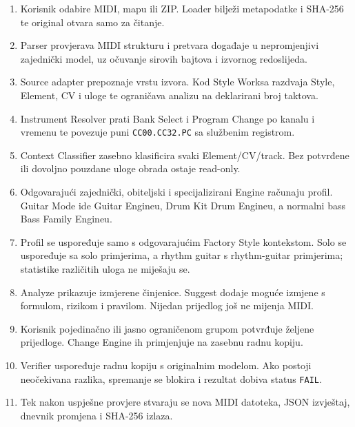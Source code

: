 \documentclass[11pt]{article}
\begin{document}
\begin{enumerate}[label=W\arabic*.]
    \item Korisnik odabire MIDI, mapu ili ZIP. Loader bilježi metapodatke i
    SHA-256 te original otvara samo za čitanje.

    \item Parser provjerava MIDI strukturu i pretvara događaje u nepromjenjivi
    zajednički model, uz očuvanje sirovih bajtova i izvornog redoslijeda.

    \item Source adapter prepoznaje vrstu izvora. Kod Style Worksa razdvaja
    Style, Element, CV i uloge te ograničava analizu na deklarirani broj
    taktova.

    \item Instrument Resolver prati Bank Select i Program Change po kanalu i
    vremenu te povezuje puni \texttt{CC00.CC32.PC} sa službenim registrom.

    \item Context Classifier zasebno klasificira svaki Element/CV/track. Bez
    potvrđene ili dovoljno pouzdane uloge obrada ostaje read-only.

    \item Odgovarajući zajednički, obiteljski i specijalizirani Engine računaju
    profil. Guitar Mode ide Guitar Engineu, Drum Kit Drum Engineu, a normalni
    bass Bass Family Engineu.

    \item Profil se uspoređuje samo s odgovarajućim Factory Style kontekstom.
    Solo se uspoređuje sa solo primjerima, a rhythm guitar s rhythm-guitar
    primjerima; statistike različitih uloga ne miješaju se.

    \item Analyze prikazuje izmjerene činjenice. Suggest dodaje moguće izmjene
    s formulom, rizikom i pravilom. Nijedan prijedlog još ne mijenja MIDI.

    \item Korisnik pojedinačno ili jasno ograničenom grupom potvrđuje željene
    prijedloge. Change Engine ih primjenjuje na zasebnu radnu kopiju.

    \item Verifier uspoređuje radnu kopiju s originalnim modelom. Ako postoji
    neočekivana razlika, spremanje se blokira i rezultat dobiva status
    \texttt{FAIL}.

    \item Tek nakon uspješne provjere stvaraju se nova MIDI datoteka, JSON
    izvještaj, dnevnik promjena i SHA-256 izlaza.
\end{enumerate}
\end{document}
